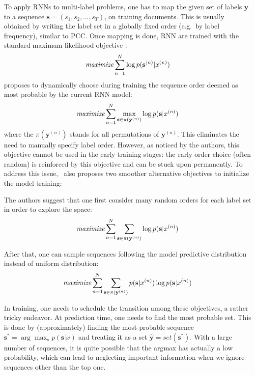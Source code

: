  
 To apply RNNs to multi-label problems, one has to map the given set of labels $\mathbf{y}$ to a sequence $\mathbf{s}=(s_1,s_2,...,s_T)$, on training documents. This is usually obtained by writing the label set in a globally fixed order (e.g.\ by label frequency), similar to PCC.
 Once mapping is done, RNN are trained with the standard maximum likelihood objective \cite{DBLP:conf/nips/NamMKF17}: 
\begin{align}
\textit{maximize} \sum_{n=1}^N \log p(\mathbf{s}^{(n)}|x^{(n)})
\label{eq:standard_rnn}
\end{align}
  proposes to dynamically choose during training the sequence order deemed as most probable by the current RNN model:
\begin{align}
\textit{maximize} \sum_{n=1}^N \max_{\mathbf{s}\in \pi(\mathbf{y}^{(n)})}\log p(\mathbf{s}|x^{(n)})
\label{eq:max_obj}
\end{align}
where the $\pi(\mathbf{y}^{(n)})$ stands for all  permutations of $\mathbf{y}^{(n)}$. This eliminates the need to manually specify label order.
However, as noticed by the authors, this objective cannot be used in the early training stages: the early order choice (often random) is reinforced by this objective and can be stuck upon permanently. To address this issue, ~also proposes two smoother alternative objectives to initialize the model training:

The authors suggest that one first consider many random orders for each label set in order to explore the space:
\begin{align}
\textit{maximize} \sum_{n=1}^N \sum_{\mathbf{s}\in \pi(\mathbf{y}^{(n)})}\log p(\mathbf{s}|x^{(n)})
\label{eq:wrong_obj}
\end{align} 

After that, one can sample sequences following the model predictive distribution instead of uniform distribution:
\begin{align}
\textit{maximize} \sum_{n=1}^N \sum_{\mathbf{s}\in \pi(\mathbf{y}^{(n)})}p(\mathbf{s}|x^{(n)})\log p(\mathbf{s}|x^{(n)})
\label{eq:sample_obj}
\end{align}  

In training, one needs to  schedule the transition among these objectives, a rather tricky endeavor. At prediction time, one needs to find the most probable set. This is done by (approximately) finding the most probable sequence $\mathbf{s}^*=\arg\max_\mathbf{s} p(\mathbf{s}|x)$ and treating it as a set $\hat{\mathbf{y}}=set(\mathbf{s}^*)$. With a large number of sequences, it is quite possible that the argmax has actually a low probability, which can lead to neglecting important information when we ignore sequences other than the top one.

